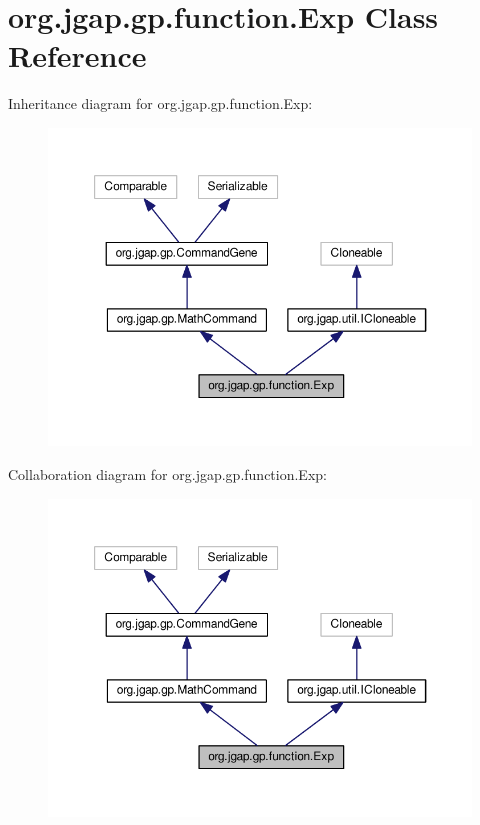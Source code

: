 \hypertarget{classorg_1_1jgap_1_1gp_1_1function_1_1_exp}{\section{org.\-jgap.\-gp.\-function.\-Exp Class Reference}
\label{classorg_1_1jgap_1_1gp_1_1function_1_1_exp}
}


Inheritance diagram for org.\-jgap.\-gp.\-function.\-Exp\-:
\nopagebreak
\begin{figure}[H]
\begin{center}
\leavevmode
\includegraphics[width=350pt]{classorg_1_1jgap_1_1gp_1_1function_1_1_exp__inherit__graph}
\end{center}
\end{figure}


Collaboration diagram for org.\-jgap.\-gp.\-function.\-Exp\-:
\nopagebreak
\begin{figure}[H]
\begin{center}
\leavevmode
\includegraphics[width=350pt]{classorg_1_1jgap_1_1gp_1_1function_1_1_exp__coll__graph}
\end{center}
\end{figure}
